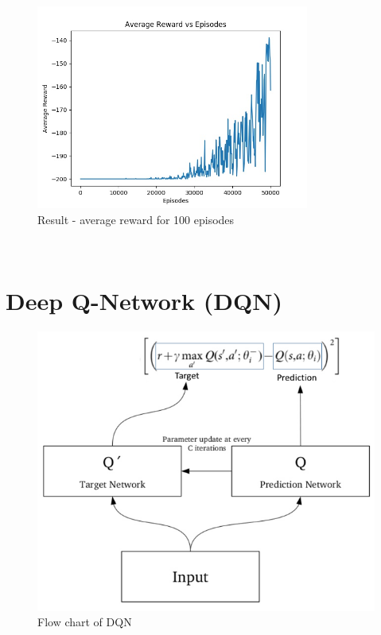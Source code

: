 \newline \begin{figure}[H]
    \centering
    \includegraphics[width=0.8\textwidth]{images/sarsaBest.jpg}
    \caption{Result - average reward for 100 episodes}
\end{figure}\\





\newline \section{Deep Q-Network (DQN)}
\begin{figure}[H]
    \centering
    \includegraphics[width=\textwidth]{images/dqn.png}
    \caption{Flow chart of DQN}
\end{figure}\\

